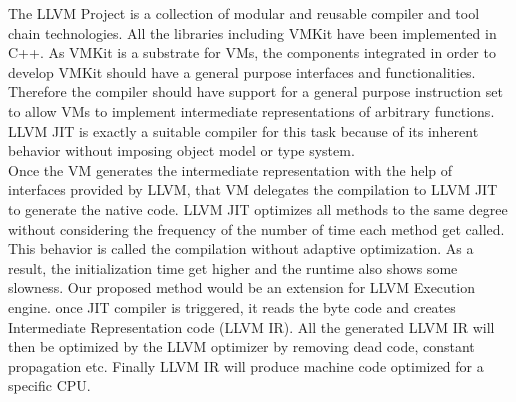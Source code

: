 \label{sec:concurrency}
The LLVM Project is a collection of modular and reusable compiler and tool chain technologies. All the libraries including VMKit have been implemented in C++. As VMKit is a substrate for VMs, the components integrated in order to develop VMKit should have a general purpose interfaces and functionalities. Therefore the compiler should have support for a general purpose instruction set to allow VMs to implement intermediate representations of arbitrary functions. LLVM JIT is exactly a suitable compiler for this task because of its inherent behavior without  imposing object model or type system.\\
Once the VM generates the intermediate representation with the help of interfaces provided by LLVM, that VM delegates the compilation to LLVM JIT to generate the native code. LLVM JIT optimizes all methods to the same degree without considering the frequency of the number of time each method get called. This behavior is called the compilation without adaptive optimization. As a result, the initialization time get higher and the runtime also shows some slowness. 
Our proposed method would be  an extension for LLVM Execution engine. once JIT compiler is triggered, it reads the byte code and creates Intermediate Representation code (LLVM IR). All the generated LLVM IR will then be optimized by the LLVM optimizer by removing dead code, constant propagation etc. Finally LLVM IR will produce machine code optimized for a specific CPU.


